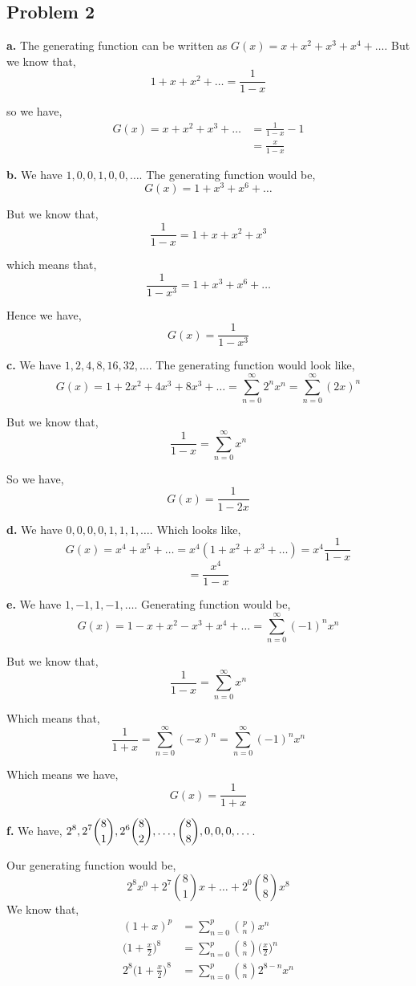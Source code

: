 \documentclass[a4paper]{report}
\begin{document}
\subsection*{Problem 2}
\textbf{a.} The generating function can be written as $G(x) = x + x^2 + x^{3} + x^{4} +  \dots$. But we know that, 
$$ 1 + x + x^2 + \dots = \frac{1}{1 - x} $$  

so we have, 
\begin{align*}
    G(x) =  x + x^2 + x^{3} + \dots &= \frac{1}{1-x} - 1 \\
                                    &= \frac{x}{1 - x} 
\end{align*}

\textbf{b.} We have $1, 0, 0, 1, 0, 0, \dots$. The generating function would be,  
$$ G(x) = 1 + x^{3} + x^{6} + \dots $$ 

But we know that, 
$$ \frac{1}{1 - x} = 1 + x + x^2 + x^{3} $$ 

which means that, 
$$ \frac{1}{1 - x^{3}} = 1 + x^{3} + x^{6} + \dots $$ 

Hence we have, 
$$ G(x) = \frac{1}{1-x^{3}} $$ 

\textbf{c. }  We have $1,2,4,8,16,32,\dots$. The generating function  would look like,  
$$ G(x) = 1 + 2x^2 + 4x^{3} + 8x^{3} + \dots = \sum_{n = 0}^{\infty} 2^{n} x^{n} = \sum_{n = 0}^{\infty} (2x)^{n} $$ 

But we know that, 
$$ \frac{1}{1-x} = \sum_{n = 0}^{\infty} x^{n} $$ 

So we have, 
$$ G(x) = \frac{1}{1 - 2x}  $$ 

\textbf{d. }  We have $0,0,0,0,1,1,1,\dots$. Which looks like,  
$$ G(x) = x^{4} + x^{5} + \dots = x^{4} (1 + x^2 + x^{3} + \dots) = x^{4} \frac{1}{1-x}$$ 
$$ = \frac{x^{4}}{1 - x} $$ 


\textbf{e. } We have $1, -1, 1, -1, \dots$. Generating function would be,  
$$ G(x) = 1 - x + x^2 - x^{3} + x^{4} + \dots = \sum_{n = 0}^{\infty} (-1)^n x^{n} $$ 

But we know that, 
$$ \frac{1}{1-x} = \sum_{n=0}^{\infty} x^{n}$$

Which means that, 
$$ \frac{1}{1 + x} = \sum_{n=0}^{\infty} (-x)^{n} = \sum_{n=0}^{\infty} (-1)^{n} x^{n} $$ 

Which means we have, 
$$  G(x) = \frac{1}{1 + x}$$ 


\textbf{f. } We have, $\displaystyle \displaystyle 2^8,2^7\binom{8}{1}, 2^6\binom{8}{2},\dots,\binom{8}{8},0,0,0,\dots$. 

Our generating function would be, 
$$ 2^{8}x^{0} + 2^{7}{8 \choose 1}x + \dots + 2^{0}{8 \choose 8}x^{8} $$ 
We know that, 
\begin{align*}
    (1 + x)^{p} &= \sum_{n=0}^{p} {p \choose n} x^{n}\\
    \bigg(1 + \frac{x}{2}\bigg)^{8} &= \sum_{n=0}^{p} {8 \choose n} \bigg(\frac{x}{2}\bigg)^{n}\\
    2^{8}\bigg(1 + \frac{x}{2}\bigg)^{8} &= \sum_{n=0}^{p} {8 \choose n} 2^{8 - n}x^{n} \\
\end{align*}
\end{document}
